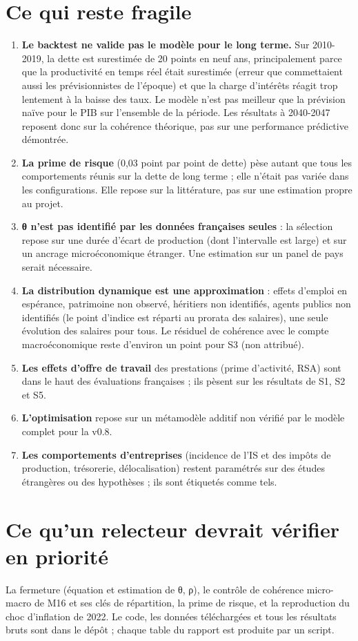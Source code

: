 \section{Ce qui reste fragile}

\begin{enumerate}
\item \textbf{Le backtest ne valide pas le modèle pour le long terme.} Sur 2010-2019, la dette est surestimée de 20
points en neuf ans, principalement parce que la productivité en temps réel était surestimée (erreur que commettaient
aussi les prévisionnistes de l'époque) et que la charge d'intérêts réagit trop lentement à la baisse des taux. Le
modèle n'est pas meilleur que la prévision naïve pour le PIB sur l'ensemble de la période. Les résultats à 2040-2047
reposent donc sur la cohérence théorique, pas sur une performance prédictive démontrée.
\item \textbf{La prime de risque} (0,03 point par point de dette) pèse autant que tous les comportements réunis sur la
dette de long terme ; elle n'était pas variée dans les configurations. Elle repose sur la littérature, pas sur une
estimation propre au projet.
\item \textbf{θ n'est pas identifié par les données françaises seules} : la sélection repose sur une durée d'écart de
production (dont l'intervalle est large) et sur un ancrage microéconomique étranger. Une estimation sur un panel de
pays serait nécessaire.
\item \textbf{La distribution dynamique est une approximation} : effets d'emploi en espérance, patrimoine non observé,
héritiers non identifiés, agents publics non identifiés (le point d'indice est réparti au prorata des salaires), une
seule évolution des salaires pour tous. Le résiduel de cohérence avec le compte macroéconomique reste d'environ un
point pour S3 (non attribué).
\item \textbf{Les effets d'offre de travail} des prestations (prime d'activité, RSA) sont dans le haut des évaluations
françaises ; ils pèsent sur les résultats de S1, S2 et S5.
\item \textbf{L'optimisation} repose sur un métamodèle additif non vérifié par le modèle complet pour la v0.8.
\item \textbf{Les comportements d'entreprises} (incidence de l'IS et des impôts de production, trésorerie,
délocalisation) restent paramétrés sur des études étrangères ou des hypothèses ; ils sont étiquetés comme tels.
\end{enumerate}

\section{Ce qu'un relecteur devrait vérifier en priorité}

La fermeture (équation et estimation de θ, ρ), le contrôle de cohérence micro-macro de M16 et ses clés de répartition,
la prime de risque, et la reproduction du choc d'inflation de 2022. Le code, les données téléchargées et tous les
résultats bruts sont dans le dépôt ; chaque table du rapport est produite par un script.

